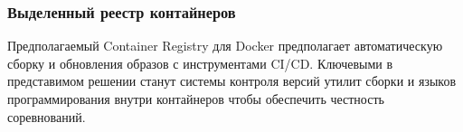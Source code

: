 \subsubsection{Выделенный реестр контайнеров}

Предполагаемый Container Registry для Docker предполагает автоматическую сборку и обновления образов с инструментами CI/CD.
Ключевыми в представимом решении станут системы контроля версий утилит сборки и языков программирования внутри контайнеров чтобы обеспечить честность соревнований.






